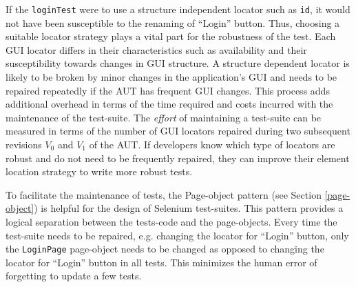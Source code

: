 If the \texttt{loginTest} were to use a structure independent locator such as \texttt{id}, it would not have been susceptible to the renaming of ``Login'' button. Thus, choosing a suitable locator strategy plays a vital part for the robustness of the test. Each GUI locator differs in their characteristics such as availability and their susceptibility towards changes in GUI structure. A structure dependent locator is likely to be broken by minor changes in the application's GUI and needs to be repaired repeatedly if the AUT has frequent GUI changes. This process adds additional overhead in terms of the time required and costs incurred with the maintenance of the test-suite. The \textit{effort} of maintaining a test-suite can be measured in terms of the number of GUI locators repaired during two subsequent revisions $V_{0}$ and $V_{1}$ of the AUT. If developers know which type of locators are robust and do not need to be frequently repaired, they can improve their element location strategy to write more robust tests. 

To facilitate the maintenance of tests, the Page-object pattern (see Section \ref{page-object}) is helpful for the design of Selenium test-suites. This pattern provides a logical separation between the tests-code and the page-objects. Every time the test-suite needs to be repaired, e.g. changing the locator for ``Login'' button, only the \texttt{LoginPage} page-object needs to be changed as opposed to changing the locator for ``Login'' button in all tests. This minimizes the human error of forgetting to update a few tests. 


